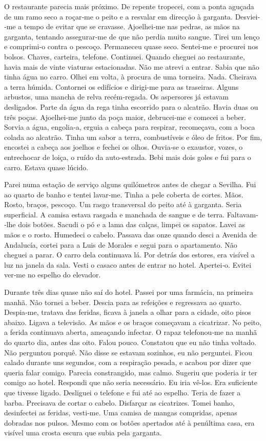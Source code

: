 O restaurante parecia mais próximo. De repente tropecei, com a ponta
aguçada de um ramo seco a roçar­‑me o peito e a resvalar em direcção à
garganta. Desviei­‑me a tempo de evitar que se cravasse. Ajoelhei­‑me
nas pedras, as mãos na garganta, tentando assegurar­‑me de que não
perdia muito sangue. Tirei um lenço e comprimi­‑o contra o pescoço.
Permaneceu quase seco. Sentei­‑me e procurei nos bolsos. Chaves,
carteira, telefone. Continuei. Quando cheguei ao restaurante, havia mais
de vinte viaturas estacionadas. Não me atrevi a entrar. Sabia que não
tinha água no carro. Olhei em volta, à procura de uma torneira. Nada.
Cheirava a terra húmida. Contornei os edifícios e dirigi­‑me para as
traseiras. Alguns arbustos, uma mancha de relva recém­‑regada. Os
aspersores já estavam desligados. Parte da água da rega tinha escorrido
para o alcatrão. Havia duas ou três poças. Ajoelhei­‑me junto da poça
maior, debrucei­‑me e comecei a beber. Sorvia a água, engolia­‑a, erguia
a cabeça para respirar, recomeçava, com a boca colada ao alcatrão. Tinha
um sabor a terra, combustíveis e óleo de fritos. Por fim, encostei a
cabeça aos joelhos e fechei os olhos. Ouvia­‑se o exaustor, vozes, o
entrechocar de loiça, o ruído da auto­‑estrada. Bebi mais dois goles e
fui para o carro. Estava quase lúcido.

Parei numa estação de serviço alguns quilómetros antes de chegar a
Sevilha. Fui ao quarto de banho e tentei lavar­‑me. Tinha a pele coberta
de cortes. Mãos. Rosto, braços, pescoço. Um rasgo transversal do peito
até à garganta. Seria superficial. A camisa estava rasgada e manchada de
sangue e de terra. Faltavam­‑lhe dois botões. Sacudi o pó e a lama das
calças, limpei os sapatos. Lavei as mãos e o rosto. Humedeci o cabelo.
Passava das onze quando desci a Avenida de Andalucía, cortei para a Luis
de Morales e segui para o apartamento. Não cheguei a parar. O carro dela
continuava lá. Por detrás dos estores, era visível a luz na janela da
sala. Vesti o casaco antes de entrar no hotel. Apertei­‑o. Evitei
ver­‑me no espelho do elevador.

Durante três dias quase não saí do hotel. Passei por uma farmácia, na
primeira manhã. Não tornei a beber. Descia para as refeições e
regressava ao quarto. Despia­‑me, tratava das feridas, ficava à janela a
olhar para a cidade, oito pisos abaixo. Ligava a televisão. As mãos e os
braços começavam a cicatrizar. No peito, a ferida continuava aberta,
ameaçando infectar. O rapaz telefonou­‑me na manhã do quarto dia, antes
das oito. Falou pouco. Constatou que eu não tinha voltado. Não perguntou
porquê. Não disse se estavam sozinhos, eu não perguntei. Ficou calado
durante uns segundos, com a respiração pesada, e acabou por dizer que
queria falar comigo. Parecia constrangido, mas calmo. Sugeriu que
poderia ir ter comigo ao hotel. Respondi que não seria necessário. Eu
iria vê­‑los. Era suficiente que tivesse ligado. Desliguei o telefone e
fui até ao espelho. Teria de fazer a barba. Precisava de cortar o
cabelo. Disfarçar as cicatrizes. Tomei banho, desinfectei as feridas,
vesti­‑me. Uma camisa de mangas compridas, apenas dobradas nos pulsos.
Mesmo com os botões apertados até à penúltima casa, era visível uma
crosta escura que subia pela garganta.

